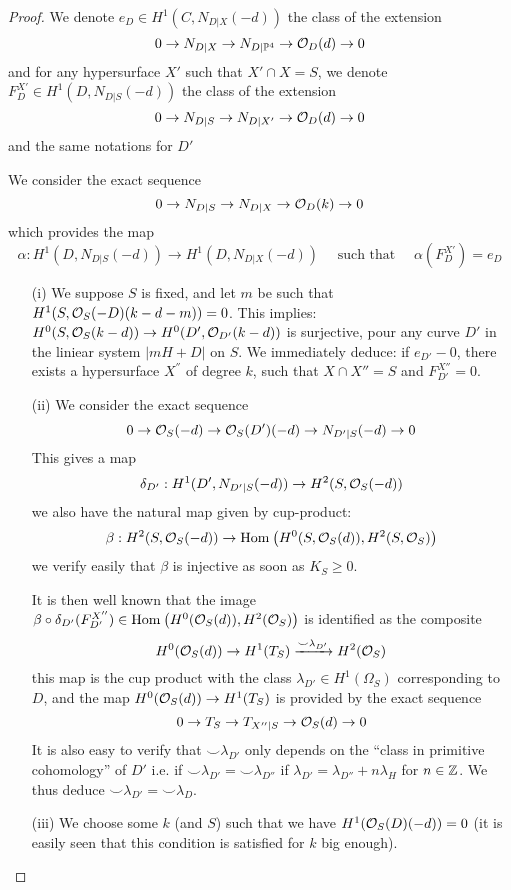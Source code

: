 \documentclass[12pt]{article}
\begin{document}
\begin{proof}
We denote $e_D \in H^1(C, N_{D|X}(-d))$ the class of the extension
\[ 0 \to N_{D|X} \to N_{D | \mathbb{P}^4} \to \mathcal{O}_{D}(d) \to 0 \]
and for any hypersurface $X'$ such that $X' \cap X = S$, we denote $F_D^{X'} \in H^1(D, N_{D|S}(-d))$ the class of the extension
\[ 0 \to N_{D|S} \to N_{D|X'} \to \mathcal{O}_{D}(d) \to 0 \]
and the same notations for $D'$
\par 
We consider the exact sequence
\[ 0 \to N_{D|S} \to N_{D|X} \to \mathcal{O}_{D}(k) \to 0 \]
which provides the map
\[ \alpha : H^1(D, N_{D|S}(-d)) \to H^1(D, N_{D|X}(-d)) \quad \text{ such that } \quad \alpha(F_D^{X'}) = e_D \]
\begin{enumerate}
\item[(i)] We suppose $S$ is fixed, and let $m$ be such that $H^1(S, \mathcal{O}_{S}(-D)(k- d - m)) = 0$. This implies: $H^0(S, \mathcal{O}_{S}(k-d)) \to H^0(D', \mathcal{O}_{D'}(k-d))$ is surjective, pour any curve $D'$ in the liniear system $| m H + D|$ on $S$. We immediately deduce: if $e_{D'} - 0$, there exists a hypersurface $X^{''}$ of degree $k$, such that $X \cap X'' = S$ and $F^{X''}_{D'} = 0$.

\item[(ii)] We consider the exact sequence
\[ 0 \to \mathcal{O}_{S}(-d) \to \mathcal{O}_{S}(D')(-d) \to N_{D'|S}(-d) \to 0 \]
This gives a map
\[ \delta_{D'} : H^1(D', N_{D' | S}(-d)) \to H^2(S, \mathcal{O}_{S}(-d)) \]
we also have the natural map given by cup-product:
\[ \beta : H^2(S, \mathcal{O}_{S}(-d)) \to \mathrm{Hom}_{} \left( H^0(S, \mathcal{O}_{S}(d)), H^2(S, \mathcal{O}_{S}) \right) \]
we verify easily that $\beta$ is injective as soon as $K_S \ge 0$.
\par 
It is then well known that the image $\beta \circ \delta_{D'}(F^{X''}_{D'}) \in \mathrm{Hom}_{} \left( H^0(\mathcal{O}_{S}(d)), H^2(\mathcal{O}_{S}) \right)$ is identified as the composite 
\[ H^0(\mathcal{O}_{S}(d)) \to H^1(T_S) \xrightarrow{\smile \lambda_{D'}} H^2(\mathcal{O}_{S}) \]
this map is the cup product with the class $\lambda_{D'} \in H^1(\Omega_S)$ corresponding to $D$, and the map $H^0(\mathcal{O}_{S}(d)) \to H^1(T_S)$ is provided by the exact sequence
\[ 0 \to T_S \to T_{X''|S} \to \mathcal{O}_{S}(d) \to 0 \]
It is also easy to verify that $\smile \lambda_{D'}$ only depends on the ``class in primitive cohomology'' of $D'$ i.e. if $\smile \lambda_{D'} = \smile \lambda_{D''}$ if $\lambda_{D'} = \lambda_{D''} + n \lambda_H$ for $n \in \mathbb{Z}$. We thus deduce $\smile \lambda_{D'} = \smile \lambda_D$. 

\item[(iii)] We choose some $k$ (and $S$) such that we have $H^1(\mathcal{O}_{S}(D)(-d)) = 0$ (it is easily seen that this condition is satisfied for $k$ big enough).


\end{enumerate}
\end{proof}
\end{document}

